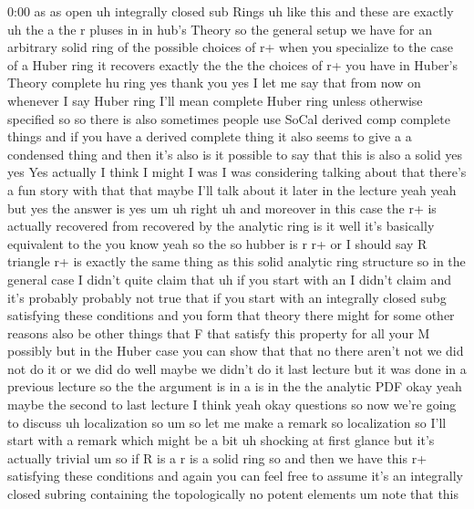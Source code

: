 \begin{unfinished}{0:00}
as  as
open  uh  integrally  closed  sub
Rings  uh  like  this  and  these  are
exactly  uh  the  a  the  r  pluses  in  in
hub's
Theory
so  the  general  setup  we  have  for  an
arbitrary  solid  ring  of  the  possible
choices  of  r+  when  you  specialize  to  the
case  of  a  Huber  ring  it  recovers  exactly
the  the  the  choices  of  r+  you  have  in
Huber's  Theory  complete  hu  ring  yes
thank  you  yes  I  let  me  say  that  from  now
on  whenever  I  say  Huber  ring  I'll  mean
complete  Huber  ring  unless  otherwise
specified  so  so  there  is  also  sometimes
people  use  SoCal  derived  comp  complete
things  and  if  you  have  a  derived
complete  thing  it  also  seems  to  give  a  a
condensed  thing  and  then  it's  also  is  it
possible  to  say  that  this  is  also  a
solid  yes  yes  Yes  actually  I  think  I
might  I  was  I  was  considering  talking
about  that  there's  a  fun  story  with  that
that  maybe  I'll  talk  about  it  later  in
the  lecture  yeah  yeah  but  yes  the  answer
is  yes
um  uh  right  uh  and
moreover  in  this  case  the  r+  is  actually
recovered
from  recovered  by  the  analytic
ring  is  it  well  it's  basically
equivalent  to  the  you  know  yeah  so  the
so  hubber  is  r  r+  or  I  should  say  R
triangle  r+  is  exactly  the  same  thing  as
this  solid  analytic  ring
structure  so  in  the  general  case  I
didn't  quite  claim
that  uh  if  you  start  with  an  I  didn't
claim  and  it's  probably  probably  not
true  that  if  you  start  with  an
integrally  closed  subg  satisfying  these
conditions  and  you  form  that  theory
there  might  for  some  other  reasons  also
be  other  things  that  F  that  satisfy  this
property  for  all  your  M  possibly  but  in
the  Huber  case  you  can  show  that  that  no
there  aren't  not  we  did  not  do  it  or  we
did  do  well  maybe  we  didn't  do  it  last
lecture  but  it  was  done  in  a  previous
lecture  so  the  the  argument  is  in  a  is
in  the  the  analytic  PDF
okay  yeah  maybe  the  second  to  last
lecture  I
think
yeah
okay
questions
so  now  we're  going  to  discuss  uh
localization
so  um  so  let  me  make  a  remark  so
localization  so  I'll  start  with  a  remark
which  might  be  a  bit  uh  shocking  at
first  glance  but  it's  actually  trivial
um  so  if  R  is
a  r  is  a  solid  ring
so  and  then  we  have  this
r+  satisfying  these  conditions  and  again
you  can  feel  free  to  assume  it's  an
integrally  closed  subring  containing  the
topologically  no  potent
elements  um  note  that  this

\end{unfinished}
